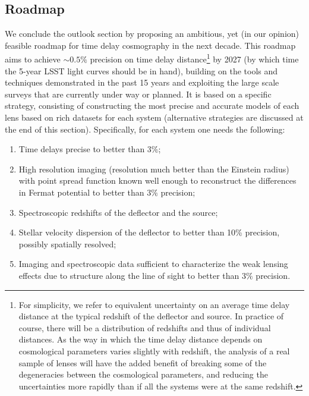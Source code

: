 
\subsection{Roadmap}
\label{ssec:roadmap}

We conclude the outlook section by proposing an ambitious, yet (in our
opinion) feasible roadmap for time delay cosmography in the next
decade. This roadmap aims to achieve $\sim0.5\%$ precision on time delay
distance\footnote{For simplicity, we refer to equivalent uncertainty
on an average time delay distance at the typical redshift of the
deflector and source. In practice of course, there will be a
distribution of redshifts and thus of individual distances. As the
way in which the time delay distance depends on cosmological parameters
varies slightly with redshift, the analysis of a real sample of
lenses will have the added benefit of breaking some of the
degeneracies between the cosmological parameters,
and reducing the uncertainties more rapidly than if all
the systems were at the same redshift.} by 2027 (by which time
the 5-year LSST light curves should be in hand),
building on the tools and techniques demonstrated in
the past 15 years and exploiting the large scale surveys that are
currently under way or planned. It is based on a specific strategy,
consisting of constructing the most precise and accurate models of
each lens based on rich datasets for each system (alternative
strategies are discussed at the end of this section). Specifically,
for each system one needs the following:

\begin{enumerate}
\item Time delays precise to better than $3\%$;
\item High resolution imaging (resolution much better than the Einstein
radius) with point spread function known well enough to reconstruct the
differences in Fermat potential to better than $3\%$ precision;
\item Spectroscopic redshifts of the deflector and the source;
\item Stellar velocity dispersion of the deflector to better than 10\%
precision, possibly spatially resolved;
\item Imaging and spectroscopic data sufficient to characterize the
weak lensing effects due to structure along the line of sight to better than
$3\%$ precision.
\end{enumerate}

